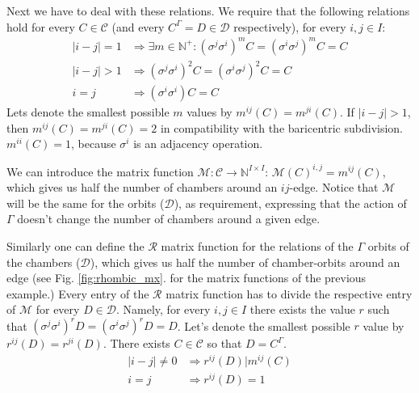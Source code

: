 \documentclass[12pt,a4paper]{article}
\numberwithin{equation}{section}
\theoremstyle{plain}%
\theoremstyle{definition}
\theoremstyle{remark}
\newtheorem*{note}{Note}
\begin{document}

Next we have to deal with these relations. We require that the following
relations hold for every $C\in\mathcal{C}$ (and every $C^\Gamma=D\in\mathcal{D}$
respectively), for every $i,j\in I$:
\begin{align}
  \label{eqn:mxfun_constraint_begin}|i-j|=1 & \Rightarrow \exists m\in\mathbb{N}^+: (\sigma^j\sigma^i)^mC=(\sigma^i\sigma^j)^mC=C \\
  |i-j|>1 & \Rightarrow (\sigma^j\sigma^i)^2C=(\sigma^i\sigma^j)^2C=C \\
  i=j & \Rightarrow (\sigma^i\sigma^i)C=C
\end{align}
Lets denote the smallest possible $m$ values by $m^{ij}(C)=m^{ji}(C)$.
If $|i-j|>1$, then $m^{ij}(C)=m^{ji}(C)=2$ in compatibility with the baricentric subdivision.  
$m^{ii}(C)=1$, because $\sigma^i$ is an adjacency operation.

We can introduce the matrix function $\mathcal{M}: \mathcal{C}
\rightarrow \mathbb{N}^{I\times I}$: $\mathcal{M}(C)^{i,j}=m^{ij}(C)$, which
gives us half the number of chambers around an $ij$-edge. Notice that $\mathcal{M}$
will be the same for the orbits ($\mathcal{D}$), as requirement, expressing that
the action of $\Gamma$ doesn't change the number of chambers around a given
edge.

Similarly one can define the $\mathcal{R}$ matrix function for the
relations of the $\Gamma$ orbits of the chambers ($\mathcal{D}$), which gives us
half the number of chamber-orbits around an edge (see Fig. \ref{fig:rhombic_mx}.
for the matrix functions of the previous example.) Every entry of the $\mathcal{R}$
matrix function has to divide the respective entry of $\mathcal{M}$ for
every $D\in\mathcal{D}$. Namely, for every $i,j\in I$ there exists the value $r$ such that
$(\sigma^j\sigma^i)^rD=(\sigma^i\sigma^j)^rD=D$. Let's denote the smallest
possible $r$ value by $r^{ij}(D)=r^{ji}(D)$. There exists $C\in\mathcal{C}$ so
that $D=C^\Gamma$.
\begin{align}
  |i-j|\ne0 & \Rightarrow r^{ij}(D)|m^{ij}(C) \\
  \label{eqn:mxfun_constraint_end}i=j & \Rightarrow r^{ij}(D)=1
\end{align}
\end{document}
